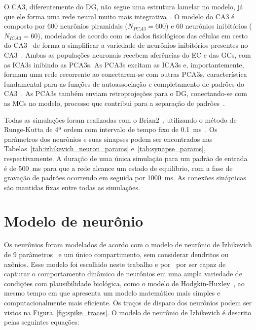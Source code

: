 O CA3, diferentemente do DG, não segue uma estrutura lamelar no modelo, já que ele forma uma rede neural muito mais
integrativa~\cite{pakHippocampal2022, watsonHuman2025}. O modelo do CA3 é composto por 600 neurônios piramidais ($N_{PCA3} = 600$)
e 60 neurônios inibitórios ($N_{ICA3} = 60$), modelados de acordo com os dados fisiológicos das células em cesto do
CA3~\cite{wheelerHippocampomeorg2023} de forma a simplificar a variedade de neurônios inibitórios presentes no
CA3~\cite{kopsickFormation2024}. Ambas as populações neuronais recebem aferências do EC e das GCs, com as ICA3s inibindo as PCA3s.
As PCA3s excitam as ICA3s e, importantemente, formam uma rede recorrente ao conectarem-se com outras PCA3s, característica
fundamental para as funções de autoassociação e completamento de padrões do CA3~\cite{kopsickFormation2024, rollsMechanisms2013}.
As PCA3s também enviam retroprojeções para o DG, conectando-se com as MCs no modelo, processo que contribui para a separação de
padrões~\cite{myersPattern2011}.

Todas as simulações foram realizadas com o Brian2~\cite{stimbergBrian2019a}, utilizando o método de Runge-Kutta de 4ª ordem com
intervalo de tempo fixo de \SI{0.1}{\milli\second}~\cite{butcherHistory1996}. Os parâmetros dos neurônios e suas sinapses podem
ser encontrados nas Tabelas~\ref{tab:izhikevich_neuron_params} e~\ref{tab:synapse_params}, respectivamente. A duração de uma única
simulação para um padrão de entrada é de \SI{500}{\milli\second} para que a rede alcance um estado de equilíbrio, com a fase de
gravação de padrões ocorrendo em seguida por \SI{1000}{\milli\second}. As conexões sinápticas são mantidas fixas entre todas as
simulações.



\section{Modelo de neurônio}

Os neurônios foram modelados de acordo com o modelo de neurônio de Izhikevich de 9
parâmetros~\cite[cap.~8]{izhikevichDynamical2006} e um único compartimento, sem considerar dendritos ou axônios. Esse modelo foi
escolhido neste trabalho e por~ por ser capaz de capturar o comportamento dinâmico de
neurônios em uma ampla variedade de condições com plausibilidade biológica, como o modelo de
Hodgkin-Huxley~\cite{hodgkinQuantitative1952b}, ao mesmo tempo em que apresenta um modelo matemático mais simples e
computacionalmente mais eficiente. Os traços de disparo dos neurônios podem ser vistos na Figura~\ref{fig:spike_traces}. O modelo
de neurônio de Izhikevich é descrito pelas seguintes equações:


